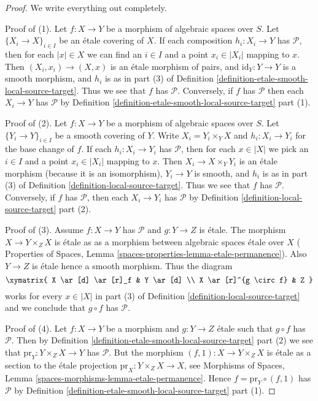 \begin{proof}
We write everything out completely.

\medskip\noindent
Proof of (1). Let $f : X \to Y$ be a morphism of algebraic spaces over $S$.
Let $\{X_i \to X\}_{i \in I}$ be an \'etale covering of $X$. If each composition
$h_i : X_i \to Y$ has $\mathcal{P}$, then for each $|x| \in X$ we can find
an $i \in I$ and a point $x_i \in |X_i|$ mapping to $x$. Then
$(X_i, x_i) \to (X, x)$ is an \'etale morphism of pairs, and
$\text{id}_Y : Y \to Y$ is a smooth morphism, and $h_i$ is as in part (3) of
Definition \ref{definition-etale-smooth-local-source-target}.
Thus we see that $f$ has $\mathcal{P}$.
Conversely, if $f$ has $\mathcal{P}$ then each $X_i \to Y$ has
$\mathcal{P}$ by
Definition \ref{definition-etale-smooth-local-source-target} part (1).

\medskip\noindent
Proof of (2). Let $f : X \to Y$ be a morphism of algebraic spaces over $S$.
Let $\{Y_i \to Y\}_{i \in I}$ be a smooth covering of $Y$.
Write $X_i = Y_i \times_Y X$ and $h_i : X_i \to Y_i$ for the base change
of $f$. If each  $h_i : X_i \to Y_i$ has $\mathcal{P}$, then for each
$x \in |X|$ we pick an $i \in I$ and a point $x_i \in |X_i|$ mapping to $x$.
Then $X_i \to X \times_Y Y_i$ is an \'etale morphism
(because it is an isomorphism), $Y_i \to Y$ is
smooth, and $h_i$ is as in part (3) of
Definition \ref{definition-local-source-target}.
Thus we see that $f$ has $\mathcal{P}$.
Conversely, if $f$ has $\mathcal{P}$, then each $X_i \to Y_i$ has
$\mathcal{P}$ by
Definition \ref{definition-local-source-target} part (2).

\medskip\noindent
Proof of (3). Assume $f : X \to Y$ has $\mathcal{P}$ and $g : Y \to Z$ is
\'etale. The morphism $X \to Y \times_Z X$ is \'etale as as a morphism
between algebraic spaces \'etale over $X$ (
Properties of Spaces, Lemma \ref{spaces-properties-lemma-etale-permanence}).
Also $Y \to Z$ is \'etale hence a smooth morphism.
Thus the diagram
$$
\xymatrix{
X \ar[d] \ar[r]_f & Y \ar[d] \\
X \ar[r]^{g \circ f} & Z
}
$$
works for every $x \in |X|$ in part (3) of
Definition \ref{definition-local-source-target}
and we conclude that $g \circ f$ has $\mathcal{P}$.

\medskip\noindent
Proof of (4). Let $f : X \to Y$ be a morphism and $g : Y \to Z$ \'etale
such that $g \circ f$ has $\mathcal{P}$. Then by
Definition \ref{definition-etale-smooth-local-source-target} part (2)
we see that $\text{pr}_Y : Y \times_Z X \to Y$ has $\mathcal{P}$. But
the morphism $(f, 1) : X \to Y \times_Z X$ is \'etale as a section to the
\'etale projection $\text{pr}_X : Y \times_Z X \to X$, see
Morphisms of Spaces, Lemma \ref{spaces-morphisms-lemma-etale-permanence}.
Hence $f = \text{pr}_Y \circ (f, 1)$ has $\mathcal{P}$ by
Definition \ref{definition-etale-smooth-local-source-target} part (1).
\end{proof}

